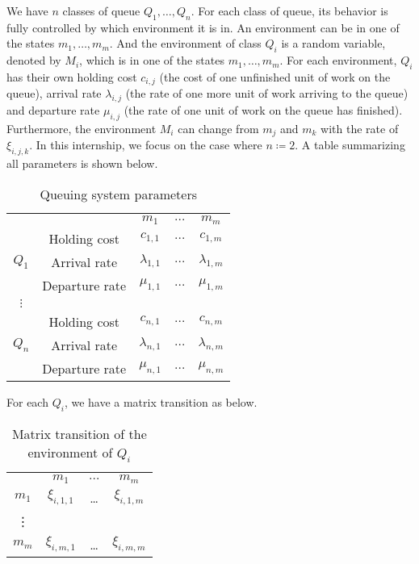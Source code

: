 \documentclass[
  a4paper, xcolor = usenames,dvipsnames]{article}
\begin{document}
We have \(n\) classes of queue \(Q_{1}, \dots, Q_{n}\). For each class of queue, its behavior is fully controlled by which environment it is in. An environment can be in one of the states \(m_{1}, \dots, m_{m}\). And the environment of class \(Q_{i}\) is a random variable, denoted by \(M_{i}\), which is in one of the states \(m_{1}, \dots, m_{m}\). For each environment, \(Q_{i}\) has their own holding cost \(c_{i, j}\) (the cost of one unfinished unit of work on the queue), arrival rate \(\lambda_{i, j}\) (the rate of one more unit of work arriving to the queue) and departure rate \(\mu_{i, j}\) (the rate of one unit of work on the queue has finished). Furthermore, the environment \(M_{i}\) can change from \(m_{j}\) and \(m_{k}\) with the rate of \(\xi_{i, j, k}\). In this internship, we focus on the case where \(n \coloneq 2\). A table summarizing all parameters is shown below.

\begin{table}[ht]
\caption{Queuing system parameters}
\begin{center}
\begin{tabular}{c c c c c}
    \hline
    \multicolumn{2}{c}{} & $m_{1}$ & $\dots$ & $m_{m}$ \\
    \cline{2-5}
    \multirow{3}{*}{$Q_{1}$} &  Holding cost & $c_{1, 1}$ & $\dots$ & $c_{1, m}$ \\
    & Arrival rate & $\lambda_{1, 1}$ & $\dots$ & $\lambda_{1, m}$ \\
    & Departure rate & $\mu_{1, 1}$ & $\dots$ & $\mu_{1, m}$ \\
    \cline{2-5}
    $\vdots$  \\
    \cline{2-5}
    \multirow{3}{*}{$Q_{n}$} &  Holding cost & $c_{n, 1}$ & $\dots$ & $c_{n, m}$ \\
    & Arrival rate & $\lambda_{n, 1}$ & $\dots$ & $\lambda_{n, m}$ \\
    & Departure rate & $\mu_{n, 1}$ & $\dots$ & $\mu_{n, m}$ \\
    \hline
\end{tabular}
\end{center}
\label{tab:qs-param}
\end{table}

For each \(Q_{i}\), we have a matrix transition as below.

\begin{table}[ht]
\caption{Matrix transition of the environment of $Q_{i}$}
\begin{center}
\begin{tabular}{c c c c}
    \hline
    & $m_{1}$ & $\dots$ & $m_{m}$ \\
    $m_{1}$ & $\xi_{i, 1, 1}$ & \dots & $\xi_{i, 1, m}$ \\
    \vdots \\
    $m_{m}$ & $\xi_{i, m, 1}$ & \dots & $\xi_{i, m, m}$ \\
    \hline
\end{tabular}
\end{center}
\label{tab:mat-transition-ci}
\end{table}
\end{document}
